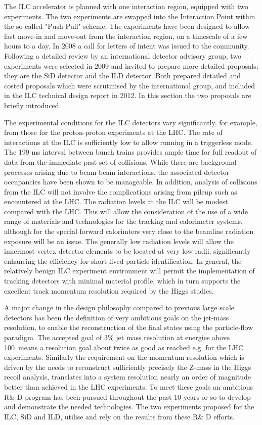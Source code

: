 The ILC accelerator is planned with one interaction region, equipped with two experiments. The two experiments are swapped into the Interaction Point within the so-called "Push-Pull" scheme. The experiments have been designed to allow fast move-in and move-out from the interaction region, on a timescale of a few hours to a day. In 2008 a call for letters of intent was issued to the community. Following a detailed review by an international detector advisory group, two experiments were selected in 2009 and invited to prepare more detailed proposals; they are the SiD detector and the ILD detector. Both prepared detailed and costed proposals which were scrutinised by the international group, and included in the ILC technical design report in 2012. In this section the two proposals are briefly introduced.

The experimental conditions for the ILC detectors vary significantly, for example, from those for the proton-proton experiments at the LHC. The rate of interactions at the ILC is sufficiently low to allow running in a triggerless mode. The 199 ms interval between bunch trains provides ample time for full readout of data from the immediate past set  of collisions. While there are background processes arising due to beam-beam interactions, the associated detector occupancies have been shown to be manageable. In addition, analysis of collisions from the ILC will not involve the complications arising from pileup such as encountered at the LHC.
The radiation levels at the ILC will be modest compared with the LHC. This will allow the consideration of the use of a wide range of materials and technologies for the tracking and calorimeter systems, although for the special forward calorimters very close to the beamline radiation exposure will be an issue. The generally low radiation levels will allow the innermost vertex detector elements to be located at very low radii, significantly enhancing the efficiency for short-lived particle identification. In general, the relatively benign ILC experiment environment will permit the implementation of tracking detectors with minimal material profile, which in turn supports the excellent track momentum resolution required by the Higgs studies.

 A major change in the design philosophy compared to previous large scale detectors has been the definition of very ambitious goals on the jet-mass resolution, to enable the reconstruction of the final states using the particle-flow paradigm. The accepted goal of $3\%$ jet mass resolution at energies above 100~\GeV means a resolution goal about twice as good as reached e.g. for the LHC experiments. Similarly the requirement on the momentum resolution which is driven by the needs to reconstruct sufficiently precisely the Z-mass in the Higgs recoil analysis, translates into a system resolution nearly an order of magnitude better than achieved in the LHC experiments. To meet these goals an ambitious R\& D program has been pursued throughout the past 10 years or so to develop and demonstrate the needed technologies. The two experiments proposed for the ILC, SiD and ILD, utilise and rely on the results from these R\& D efforts. 

